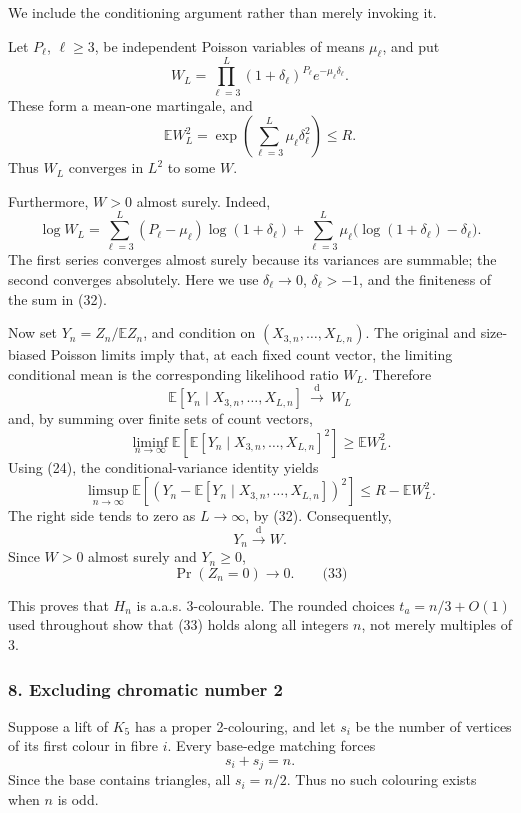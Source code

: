 \documentclass[
  11pt,
  a4paper,
]{article}
\begin{document}
We include the conditioning argument rather than merely invoking it.

Let \(P_\ell\), \(\ell\ge3\), be independent Poisson variables of means
\(\mu_\ell\), and put \[
W_L=\prod_{\ell=3}^L
       (1+\delta_\ell)^{P_\ell}e^{-\mu_\ell\delta_\ell}.
\] These form a mean-one martingale, and \[
\mathbb E W_L^2
 =\exp\left(\sum_{\ell=3}^L\mu_\ell\delta_\ell^2\right)\le R.
\] Thus \(W_L\) converges in \(L^2\) to some \(W\).

Furthermore, \(W>0\) almost surely. Indeed, \[
\log W_L
 =\sum_{\ell=3}^L
   (P_\ell-\mu_\ell)\log(1+\delta_\ell)
 +\sum_{\ell=3}^L
   \mu_\ell\bigl(\log(1+\delta_\ell)-\delta_\ell\bigr).
\] The first series converges almost surely because its variances are
summable; the second converges absolutely. Here we use
\(\delta_\ell\to0\), \(\delta_\ell>-1\), and the finiteness of the sum
in (32).

Now set \(Y_n=Z_n/\mathbb E Z_n\), and condition on
\((X_{3,n},\ldots,X_{L,n})\). The original and size-biased Poisson
limits imply that, at each fixed count vector, the limiting conditional
mean is the corresponding likelihood ratio \(W_L\). Therefore \[
\mathbb E[Y_n\mid X_{3,n},\ldots,X_{L,n}]
 \ \xrightarrow{\mathrm d}\ W_L
\] and, by summing over finite sets of count vectors, \[
\liminf_{n\to\infty}
 \mathbb E\!\left[
   \mathbb E[Y_n\mid X_{3,n},\ldots,X_{L,n}]^2
 \right]
 \ge \mathbb E W_L^2.
\] Using (24), the conditional-variance identity yields \[
\limsup_{n\to\infty}
\mathbb E\!\left[
 \left(Y_n-\mathbb E[Y_n\mid X_{3,n},\ldots,X_{L,n}]\right)^2
\right]
\le R-\mathbb E W_L^2.
\] The right side tends to zero as \(L\to\infty\), by (32).
Consequently, \[
Y_n\xrightarrow{\mathrm d}W.
\] Since \(W>0\) almost surely and \(Y_n\ge0\), \[
\Pr(Z_n=0)\longrightarrow0.                                    \qquad\text{(33)}
\]

This proves that \(H_n\) is a.a.s. 3-colourable. The rounded choices
\(t_a=n/3+O(1)\) used throughout show that (33) holds along all integers
\(n\), not merely multiples of \(3\).

\subsubsection{8. Excluding chromatic number
2}\label{excluding-chromatic-number-2}

Suppose a lift of \(K_5\) has a proper 2-colouring, and let \(s_i\) be
the number of vertices of its first colour in fibre \(i\). Every
base-edge matching forces \[
s_i+s_j=n.
\] Since the base contains triangles, all \(s_i=n/2\). Thus no such
colouring exists when \(n\) is odd.
\end{document}
